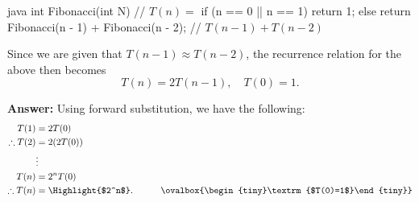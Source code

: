 \documentclass[12pt, a4paper]{article}
\newcommand*{\Comment}[1]{\tag*{\ovalbox{\begin{tiny}%
  \textrm{#1}%
\end{tiny}}}}
\begin{document}
\begin{MintedUnbreakableCodeBlock}{java}
      int Fibonacci(int N) {                          // $T(n)=$
        if (n == 0 || n == 1) {
          return 1;
        }
        else {
          return Fibonacci(n - 1) + Fibonacci(n - 2); // $T(n-1)+T(n-2)$
        }
      }
\end{MintedUnbreakableCodeBlock}

Since we are given that $T(n-1) \approx T(n-2)$,
the recurrence relation for the above then becomes
\begin{equation*}
  T(n) = 2T(n-1), \quad T(0) = 1.
\end{equation*}

\textbf{Answer:} Using forward substitution, we have the following:
\begin{align*}
  T(1) &= 2T(0) \\
  \therefore T(2) &= 2(2T(0)) \\
  &\vdots \\
  T(n) &= 2^n T(0) \\
  \therefore T(n) &= \Highlight{$2^n$}.
    & \Comment{$T(0)=1$}
\end{align*}
\end{document}

